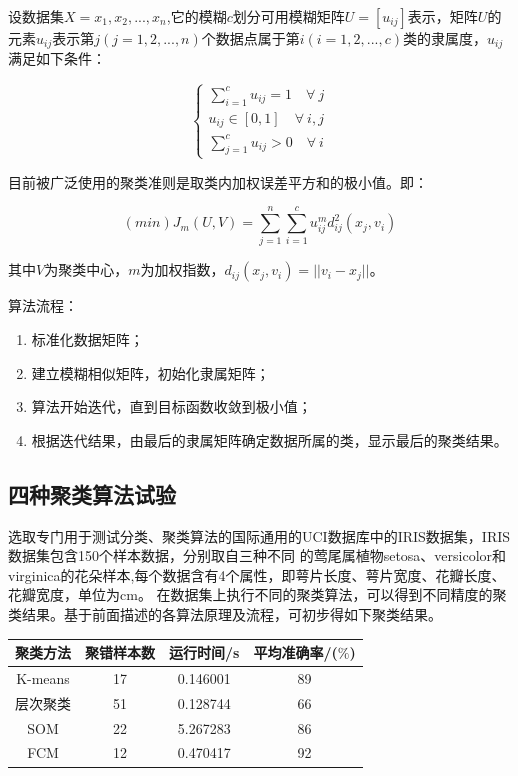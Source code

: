 设数据集$X={x_1,x_2,...,x_n}$,它的模糊$c$划分可用模糊矩阵$U=[u_{ij}]$表示，矩阵$U$的元素$u_{ij}$表示第$j(j=1,2,...,n)$个数据点属于第$i(i=1,2,...,c)$类的隶属度，$u_{ij}$满足如下条件：  

\begin{equation}
	\left\{
		\begin{array}{lr}
			\sum_{i=1}^c u_{ij}=1 \quad\forall~j
			\\u_{ij}\in[0,1] \quad\forall ~i,j
			\\\sum_{j=1}^c u_{ij}>0 \quad\forall ~i
		\end{array}
	\right.
\end{equation}

目前被广泛使用的聚类准则是取类内加权误差平方和的极小值。即：

$$
(min)J_m(U,V)=\sum^n_{j=1}\sum^c_{i=1}u^m_{ij}d^2_{ij}(x_j,v_i)
$$

其中$V$为聚类中心，$m$为加权指数，$d_{ij}(x_j,v_i)=||v_i-x_j||$。

算法流程：

\begin{enumerate}\itemsep0em 
 \item 标准化数据矩阵；
 \item 建立模糊相似矩阵，初始化隶属矩阵；
 \item 算法开始迭代，直到目标函数收敛到极小值；
 \item 根据迭代结果，由最后的隶属矩阵确定数据所属的类，显示最后的聚类结果。
\end{enumerate}

\subsection{四种聚类算法试验}

选取专门用于测试分类、聚类算法的国际通用的UCI数据库中的IRIS数据集，IRIS数据集包含150个样本数据，分别取自三种不同 的莺尾属植物setosa、versicolor和virginica的花朵样本,每个数据含有4个属性，即萼片长度、萼片宽度、花瓣长度、花瓣宽度，单位为cm。 在数据集上执行不同的聚类算法，可以得到不同精度的聚类结果。基于前面描述的各算法原理及流程，可初步得如下聚类结果。

\begin{table}[h]
	\centering
	\begin{tabular}{|c|c|c|c|}\hline
		聚类方法 & 聚错样本数 & 运行时间/s & 平均准确率/($\%$)\\\hline 
		K-means  & 17         & 0.146001   & 89               \\\hline 
		层次聚类 & 51         & 0.128744   & 66               \\\hline 
		SOM      & 22         & 5.267283   & 86               \\\hline 
		FCM      & 12         & 0.470417   & 92               \\\hline 
	\end{tabular}
\end{table}

